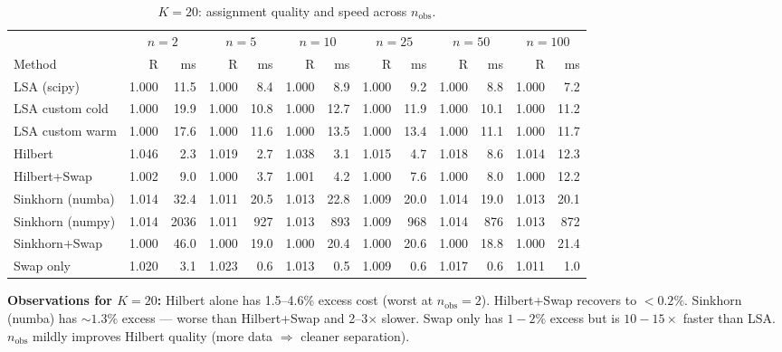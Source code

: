 \documentclass[11pt,a4paper]{article}
\begin{document}
\begin{table}[h!]
\centering
\caption{$K = 20$: assignment quality and speed across $n_{\text{obs}}$.}
\label{tab:K20}
\small
\begin{tabular}{l rrrrrrrrrrrr}
\toprule
& \multicolumn{2}{c}{$n=2$} & \multicolumn{2}{c}{$n=5$} & \multicolumn{2}{c}{$n=10$} & \multicolumn{2}{c}{$n=25$} & \multicolumn{2}{c}{$n=50$} & \multicolumn{2}{c}{$n=100$} \\
\cmidrule(lr){2-3}\cmidrule(lr){4-5}\cmidrule(lr){6-7}\cmidrule(lr){8-9}\cmidrule(lr){10-11}\cmidrule(lr){12-13}
Method & R & ms & R & ms & R & ms & R & ms & R & ms & R & ms \\
\midrule
LSA (scipy)         & 1.000 & 11.5 & 1.000 & 8.4 & 1.000 & 8.9 & 1.000 & 9.2 & 1.000 & 8.8 & 1.000 & 7.2 \\
LSA custom cold     & 1.000 & 19.9 & 1.000 & 10.8 & 1.000 & 12.7 & 1.000 & 11.9 & 1.000 & 10.1 & 1.000 & 11.2 \\
LSA custom warm     & 1.000 & 17.6 & 1.000 & 11.6 & 1.000 & 13.5 & 1.000 & 13.4 & 1.000 & 11.1 & 1.000 & 11.7 \\
Hilbert             & 1.046 & 2.3 & 1.019 & 2.7 & 1.038 & 3.1 & 1.015 & 4.7 & 1.018 & 8.6 & 1.014 & 12.3 \\
Hilbert+Swap        & 1.002 & 9.0 & 1.000 & 3.7 & 1.001 & 4.2 & 1.000 & 7.6 & 1.000 & 8.0 & 1.000 & 12.2 \\
Sinkhorn (numba)    & 1.014 & 32.4 & 1.011 & 20.5 & 1.013 & 22.8 & 1.009 & 20.0 & 1.014 & 19.0 & 1.013 & 20.1 \\
Sinkhorn (numpy)    & 1.014 & 2036 & 1.011 & 927 & 1.013 & 893 & 1.009 & 968 & 1.014 & 876 & 1.013 & 872 \\
Sinkhorn+Swap       & 1.000 & 46.0 & 1.000 & 19.0 & 1.000 & 20.4 & 1.000 & 20.6 & 1.000 & 18.8 & 1.000 & 21.4 \\
Swap only           & 1.020 & 3.1 & 1.023 & 0.6 & 1.013 & 0.5 & 1.009 & 0.6 & 1.017 & 0.6 & 1.011 & 1.0 \\
\bottomrule
\end{tabular}
\end{table}

\textbf{Observations for $K=20$:} Hilbert alone has 1.5--4.6\% excess cost (worst at $n_{\text{obs}}=2$). Hilbert+Swap recovers to $<0.2\%$. Sinkhorn (numba) has $\sim 1.3\%$ excess --- worse than Hilbert+Swap and 2--3$\times$ slower. Swap only has $1{-}2\%$ excess but is $10{-}15\times$ faster than LSA. $n_{\text{obs}}$ mildly improves Hilbert quality (more data $\Rightarrow$ cleaner separation).
\end{document}
